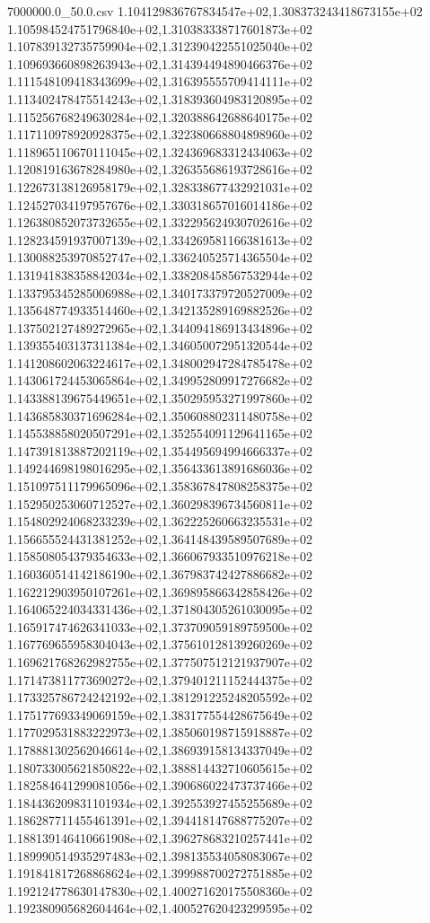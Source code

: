\begin{filecontents*}{7000000.0_50.0.csv}
1.104129836767834547e+02,1.308373243418673155e+02
1.105984524751796840e+02,1.310383338717601873e+02
1.107839132735759904e+02,1.312390422551025040e+02
1.109693660898263943e+02,1.314394494890466376e+02
1.111548109418343699e+02,1.316395555709414111e+02
1.113402478475514243e+02,1.318393604983120895e+02
1.115256768249630284e+02,1.320388642688640175e+02
1.117110978920928375e+02,1.322380668804898960e+02
1.118965110670111045e+02,1.324369683312434063e+02
1.120819163678284980e+02,1.326355686193728616e+02
1.122673138126958179e+02,1.328338677432921031e+02
1.124527034197957676e+02,1.330318657016014186e+02
1.126380852073732655e+02,1.332295624930702616e+02
1.128234591937007139e+02,1.334269581166381613e+02
1.130088253970852747e+02,1.336240525714365504e+02
1.131941838358842034e+02,1.338208458567532944e+02
1.133795345285006988e+02,1.340173379720527009e+02
1.135648774933514460e+02,1.342135289169882526e+02
1.137502127489272965e+02,1.344094186913434896e+02
1.139355403137311384e+02,1.346050072951320544e+02
1.141208602063224617e+02,1.348002947284785478e+02
1.143061724453065864e+02,1.349952809917276682e+02
1.143388139675449651e+02,1.350295953271997860e+02
1.143685830371696284e+02,1.350608802311480758e+02
1.145538858020507291e+02,1.352554091129641165e+02
1.147391813887202119e+02,1.354495694994666337e+02
1.149244698198016295e+02,1.356433613891686036e+02
1.151097511179965096e+02,1.358367847808258375e+02
1.152950253060712527e+02,1.360298396734560811e+02
1.154802924068233239e+02,1.362225260663235531e+02
1.156655524431381252e+02,1.364148439589507689e+02
1.158508054379354633e+02,1.366067933510976218e+02
1.160360514142186190e+02,1.367983742427886682e+02
1.162212903950107261e+02,1.369895866342858426e+02
1.164065224034331436e+02,1.371804305261030095e+02
1.165917474626341033e+02,1.373709059189759500e+02
1.167769655958304043e+02,1.375610128139260269e+02
1.169621768262982755e+02,1.377507512121937907e+02
1.171473811773690272e+02,1.379401211152444375e+02
1.173325786724242192e+02,1.381291225248205592e+02
1.175177693349069159e+02,1.383177554428675649e+02
1.177029531883222973e+02,1.385060198715918887e+02
1.178881302562046614e+02,1.386939158134337049e+02
1.180733005621850822e+02,1.388814432710605615e+02
1.182584641299081056e+02,1.390686022473737466e+02
1.184436209831101934e+02,1.392553927455255689e+02
1.186287711455461391e+02,1.394418147688775207e+02
1.188139146410661908e+02,1.396278683210257441e+02
1.189990514935297483e+02,1.398135534058083067e+02
1.191841817268868624e+02,1.399988700272751885e+02
1.192124778630147830e+02,1.400271620175508360e+02
1.192380905682604464e+02,1.400527620423299595e+02

\end{filecontents*}
